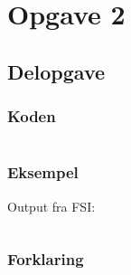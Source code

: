 \section{Opgave 2}
\subsection{Delopgave }\label{ass:1-}
\subsubsection{Koden}
\begin{lstlisting}[language=fsharp]

\end{lstlisting}

\subsubsection{Eksempel}
Output fra FSI:
\begin{lstlisting}

\end{lstlisting}

\subsubsection{Forklaring}


